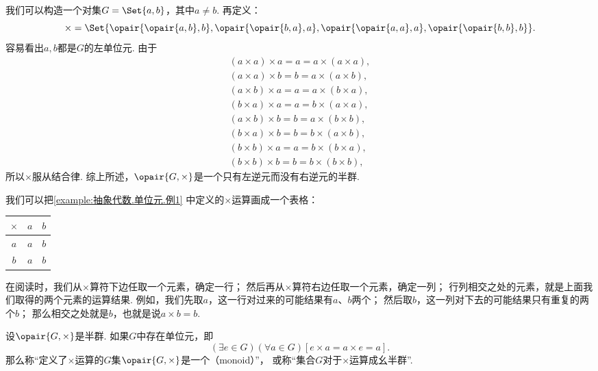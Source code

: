 \begin{example}\label{example:抽象代数.单位元.例1}
我们可以构造一个对集\(G = \Set{ a, b }\)，其中\(a \neq b\).
再定义：\begin{equation*}
	\times = \Set{
		\opair{\opair{a,b},b},
		\opair{\opair{b,a},a},
		\opair{\opair{a,a},a},
		\opair{\opair{b,b},b}
	}.
\end{equation*}
容易看出\(a,b\)都是\(G\)的左单位元.
由于\begin{align*}
	(a \times a) \times a = a = a \times (a \times a), \\
	(a \times a) \times b = b = a \times (a \times b), \\
	(a \times b) \times a = a = a \times (b \times a), \\
	(b \times a) \times a = a = b \times (a \times a), \\
	(a \times b) \times b = b = a \times (b \times b), \\
	(b \times a) \times b = b = b \times (a \times b), \\
	(b \times b) \times a = a = b \times (b \times a), \\
	(b \times b) \times b = b = b \times (b \times b),
\end{align*}
所以\(\times\)服从结合律.
综上所述，\(\opair{G,\times}\)是一个只有左逆元而没有右逆元的半群.
\end{example}

\begin{example}
我们可以把\cref{example:抽象代数.单位元.例1} 中定义的\(\times\)运算画成一个表格：
\begin{center}
\begin{tabular}{c|cc}
	\(\times\) & \(a\) & \(b\) \\ \hline
	\(a\) & \(a\) & \(b\) \\
	\(b\) & \(a\) & \(b\) \\
\end{tabular}
\end{center}
在阅读时，我们从\(\times\)算符下边任取一个元素，确定一行；
然后再从\(\times\)算符右边任取一个元素，确定一列；
行列相交之处的元素，就是上面我们取得的两个元素的运算结果.
例如，我们先取\(a\)，这一行对过来的可能结果有\(a\)、\(b\)两个；
然后取\(b\)，这一列对下去的可能结果只有重复的两个\(b\)；
那么相交之处就是\(b\)，也就是说\(a \times b = b\).
\end{example}

\begin{definition}\label{definition:抽象代数.幺半群的定义}
设\(\opair{G,\times}\)是半群.
如果\(G\)中存在单位元，即\begin{equation*}
	(\exists e \in G)(\forall a \in G)
	[e \times a = a \times e = a].
\end{equation*}
那么称“定义了\(\times\)运算的\(G\)集\(\opair{G,\times}\)是一个（monoid）”，
或称“集合\(G\)对于\(\times\)运算成幺半群”.
\end{definition}

